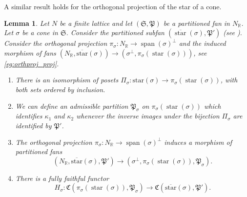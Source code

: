 \documentclass[10pt,twoside, a4paper,reqno]{amsart}
\DeclareMathOperator{\spann}{span}
\DeclareMathOperator{\starr}{star}
\newcommand{\catof}{\mathfrak{C}}
\newcommand{\Pfrak}{\mathfrak{P}}
\newcommand{\R}{\mathbb{R}}
\newcommand{\Sfan}{\mathfrak{S}}
\newtheorem{lemma}[theorem]{Lemma}
\theoremstyle{definition}
\begin{document}
A similar result holds for the orthogonal projection of the star of a cone.


\begin{lemma}\label{lem:projmorpart}
    Let $N$ be a finite lattice and let $(\Sfan,\Pfrak)$ be a partitioned fan in $N_\R$. Let $\sigma$ be a cone in $\Sfan$. Consider the partitioned subfan $({\overline{\starr}(\sigma)},\Pfrak')$ (see ). Consider the orthogonal projection $\pi_{\sigma}\colon N_\R \xrightarrow{} \spann(\sigma)^{\perp}$ and the induced morphism of fans $(N_\R, \overline{\mathrm{star}}(\sigma)) \xrightarrow{}( \sigma^\perp, \pi_{\sigma}(\starr(\sigma)))$, see \eqref{eg:orthproj_proj}.
    \begin{enumerate}
        \item\label{lem:projmorpart1} There is an isomorphism of posets 
        $\Pi_{\sigma}: {\mathrm{star}}(\sigma)\xrightarrow{}\pi_{\sigma}(\starr(\sigma))$, with both sets ordered by inclusion. 
        \item\label{lem:projmorpart2} We can define an admissible partition $\Pfrak_{\sigma}$ on $\pi_{\sigma}(\starr(\sigma))$ which identifies ${\kappa}_1$ and ${\kappa}_2$ whenever the inverse images under the bijection {$\Pi_{\sigma}$} are identified by $\Pfrak'$.
        \item\label{lem:projmorpart3} The orthogonal projection $\pi_{\sigma}\colon N_\R \xrightarrow{} \spann(\sigma)^{\perp}$ induces a morphism of partitioned fans 
        \[(N_\R, \overline{\mathrm{star}}(\sigma),\Pfrak')\xrightarrow{}(\sigma^\perp, \pi_{\sigma}(\starr(\sigma)),\Pfrak_{\sigma}).\]
        \item\label{lem:projmorpart4} There is a fully faithful functor
	\[  H_{\sigma}: \catof(\pi_{\sigma}(\starr(\sigma)),\Pfrak_{\sigma}) \to \catof(\overline{\mathrm{star}}(\sigma),\Pfrak') .\]
    \end{enumerate}
\end{lemma}
\end{document}
